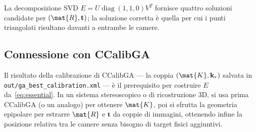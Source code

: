 La decomposizione SVD \(E=U\operatorname{diag}(1,1,0)V^T\) fornisce
quattro soluzioni candidate per \((\mat{R},\mathbf{t})\);
la soluzione corretta è quella per cui i punti triangolati risultano
davanti a entrambe le camere.

\subsection{Connessione con CCalibGA}

Il risultato della calibrazione di CCalibGA --- la coppia
\((\mat{K}, \mathbf{k}_r)\) salvata in \texttt{out/ga\_best\_calibration.xml}
--- è il prerequisito per costruire \(E\) da~\eqref{eq:essential}.
In un sistema stereoscopico o di ricostruzione 3D, si usa prima
CCalibGA (o un analogo) per ottenere \(\mat{K}\), poi si sfrutta la
geometria epipolare per estrarre \(\mat{R}\) e \(\mathbf{t}\) da coppie
di immagini, ottenendo infine la posizione relativa tra le camere senza
bisogno di target fisici aggiuntivi.
